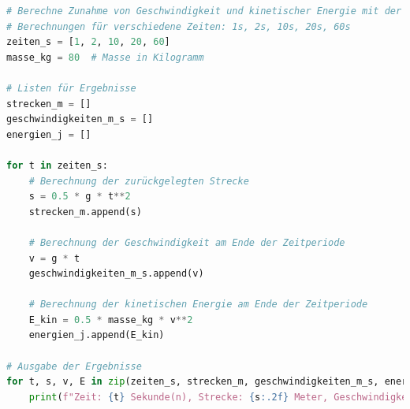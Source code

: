 \documentclass{vorlage-design-main}
\begin{document}
\begin{lstlisting}[language=Python]
# Berechne Zunahme von Geschwindigkeit und kinetischer Energie mit der Zeit im freien Fall
# Berechnungen für verschiedene Zeiten: 1s, 2s, 10s, 20s, 60s
zeiten_s = [1, 2, 10, 20, 60]
masse_kg = 80  # Masse in Kilogramm

# Listen für Ergebnisse
strecken_m = []
geschwindigkeiten_m_s = []
energien_j = []

for t in zeiten_s:
    # Berechnung der zurückgelegten Strecke
    s = 0.5 * g * t**2
    strecken_m.append(s)
    
    # Berechnung der Geschwindigkeit am Ende der Zeitperiode
    v = g * t
    geschwindigkeiten_m_s.append(v)
    
    # Berechnung der kinetischen Energie am Ende der Zeitperiode
    E_kin = 0.5 * masse_kg * v**2
    energien_j.append(E_kin)

# Ausgabe der Ergebnisse
for t, s, v, E in zip(zeiten_s, strecken_m, geschwindigkeiten_m_s, energien_j):
    print(f"Zeit: {t} Sekunde(n), Strecke: {s:.2f} Meter, Geschwindigkeit: {v:.2f} m/s, Kinetische Energie: {E:.2f} Joule")
\end{lstlisting}
\end{document}
